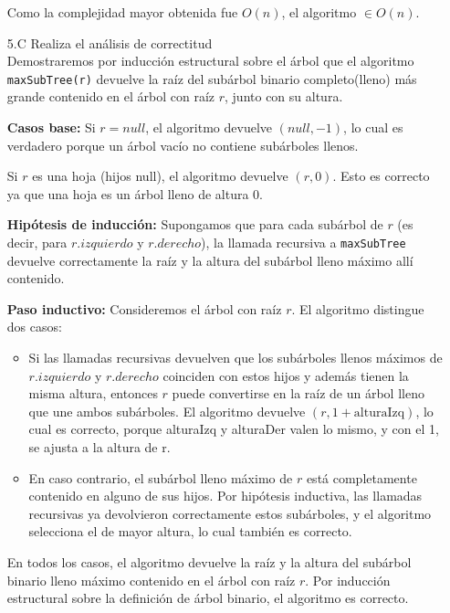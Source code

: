 \documentclass[12pt]{article}
\begin{document}
\begin{itemize}
    Como la complejidad mayor obtenida fue $O(n)$, el algoritmo $\in O(n)$.\\

    \item[5.C] Realiza el análisis de correctitud\\
    Demostraremos por inducción estructural sobre el árbol que el algoritmo
    \texttt{maxSubTree(r)} devuelve la raíz del subárbol binario completo(lleno) más
    grande contenido en el árbol con raíz $r$, junto con su altura.

    \textbf{Casos base:}
    Si $r = null$, el algoritmo devuelve $(null, -1)$, lo cual es verdadero
    porque un árbol vacío no contiene subárboles llenos.

    Si $r$ es una hoja (hijos null), el algoritmo devuelve $(r,0)$.
    Esto es correcto ya que una hoja es un árbol lleno de altura $0$.

    \textbf{Hipótesis de inducción:}
    Supongamos que para cada subárbol de $r$ (es decir, para $r.izquierdo$
    y $r.derecho$), la llamada recursiva a \texttt{maxSubTree} devuelve
    correctamente la raíz y la altura del subárbol lleno máximo allí contenido.

    \textbf{Paso inductivo:}
    Consideremos el árbol con raíz $r$. El algoritmo distingue dos casos:

    \begin{itemize}
        \item Si las llamadas recursivas devuelven que los subárboles llenos
        máximos de $r.izquierdo$ y $r.derecho$ coinciden con estos hijos y
        además tienen la misma altura, entonces $r$ puede convertirse en la raíz
        de un árbol lleno que une ambos subárboles. El algoritmo devuelve
        $(r,1+\text{alturaIzq})$, lo cual es correcto, porque alturaIzq y alturaDer valen lo mismo, y con el 1, se ajusta a la altura de r.

        \item En caso contrario, el subárbol lleno máximo de $r$ está
        completamente contenido en alguno de sus hijos. Por hipótesis inductiva,
        las llamadas recursivas ya devolvieron correctamente estos subárboles,
        y el algoritmo selecciona el de mayor altura, lo cual también es correcto.
    \end{itemize}

    En todos los casos, el algoritmo devuelve la raíz y la altura del subárbol
    binario lleno máximo contenido en el árbol con raíz $r$. Por inducción
    estructural sobre la definición de árbol binario, el algoritmo es correcto.

\end{itemize}
\end{document}
